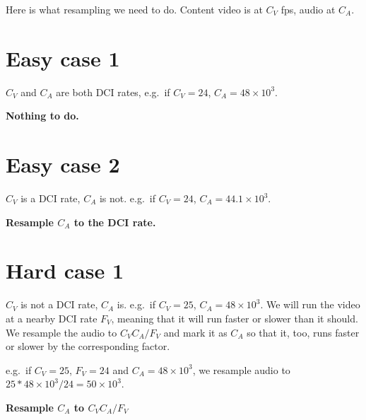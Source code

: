 \documentclass{article}
\begin{document}
Here is what resampling we need to do.  Content video is at $C_V$ fps, audio at $C_A$.  

\section{Easy case 1}

$C_V$ and $C_A$ are both DCI rates, e.g.\ if $C_V = 24$, $C_A = 48\times{}10^3$.

\medskip
\textbf{Nothing to do.}

\section{Easy case 2}

$C_V$ is a DCI rate, $C_A$ is not.  e.g.\ if $C_V = 24$, $C_A = 44.1\times{}10^3$.

\medskip
\textbf{Resample $C_A$ to the DCI rate.}

\section{Hard case 1}

$C_V$ is not a DCI rate, $C_A$ is.  e.g.\ if $C_V = 25$, $C_A =
48\times{}10^3$.  We will run the video at a nearby DCI rate $F_V$,
meaning that it will run faster or slower than it should.  We resample
the audio to $C_V C_A / F_V$ and mark it as $C_A$ so that it, too,
runs faster or slower by the corresponding factor.

e.g.\ if $C_V = 25$, $F_V = 24$ and $C_A = 48\times{}10^3$, we
resample audio to $25 * 48\times{}10^3 / 24 = 50\times{}10^3$.

\medskip
\textbf{Resample $C_A$ to $C_V C_A / F_V$}
\end{document}
